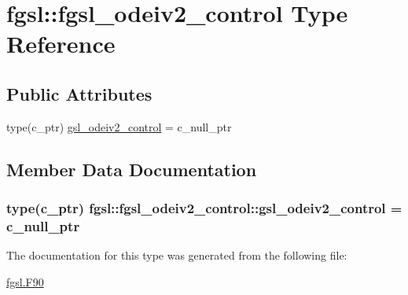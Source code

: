 \hypertarget{structfgsl_1_1fgsl__odeiv2__control}{\section{fgsl\-:\-:fgsl\-\_\-odeiv2\-\_\-control Type Reference}
\label{structfgsl_1_1fgsl__odeiv2__control}
}
\subsection*{Public Attributes}
\begin{DoxyCompactItemize}
\item 
type(c\-\_\-ptr) \hyperlink{structfgsl_1_1fgsl__odeiv2__control_ada5ecddef7af921218d9d22dad8852c4}{gsl\-\_\-odeiv2\-\_\-control} = c\-\_\-null\-\_\-ptr
\end{DoxyCompactItemize}


\subsection{Member Data Documentation}
\hypertarget{structfgsl_1_1fgsl__odeiv2__control_ada5ecddef7af921218d9d22dad8852c4}{
\subsubsection[{gsl\-\_\-odeiv2\-\_\-control}]{\setlength{\rightskip}{0pt plus 5cm}type(c\-\_\-ptr) fgsl\-::fgsl\-\_\-odeiv2\-\_\-control\-::gsl\-\_\-odeiv2\-\_\-control = c\-\_\-null\-\_\-ptr}}\label{structfgsl_1_1fgsl__odeiv2__control_ada5ecddef7af921218d9d22dad8852c4}


The documentation for this type was generated from the following file\-:\begin{DoxyCompactItemize}
\item 
\hyperlink{fgsl_8F90}{fgsl.\-F90}\end{DoxyCompactItemize}
